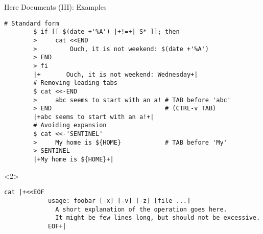 \begin{frame}[fragile]{Here Documents (III): Examples}
    \vspace{-3mm}
    \begin{lstlisting}[style=MyBash]
        # Standard form
        $ if [[ $(date +'%A') |+!=+| S* ]]; then
        >     cat <<END
        >         Ouch, it is not weekend: $(date +'%A')
        > END
        > fi
        |+       Ouch, it is not weekend: Wednesday+|
        # Removing leading tabs
        $ cat <<-END
        >     abc seems to start with an a! # TAB before 'abc'
        > END                               # (CTRL-v TAB)
        |+abc seems to start with an a!+|
        # Avoiding expansion
        $ cat <<-'SENTINEL'
        >     My home is ${HOME}            # TAB before 'My'
        > SENTINEL
        |+My home is ${HOME}+|
    \end{lstlisting}
    \begin{uncoverenv}<2>
        \begin{lstlisting}[style=MyBash, numbers=none, aboveskip=4pt]
            cat |+<<EOF
            usage: foobar [-x] [-v] [-z] [file ...]
              A short explanation of the operation goes here.
              It might be few lines long, but should not be excessive.
            EOF+|
        \end{lstlisting}
    \end{uncoverenv}
\end{frame}
